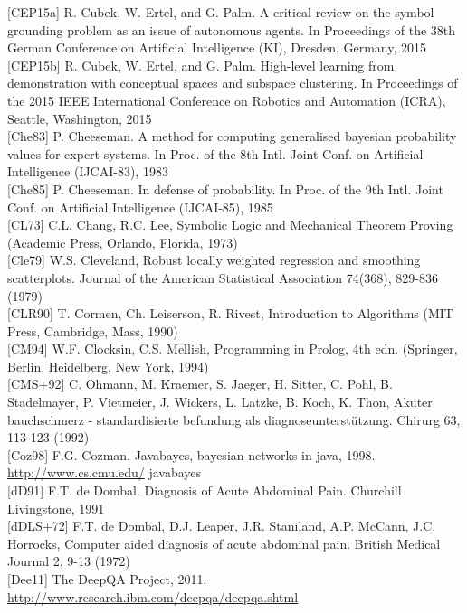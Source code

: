 \documentclass[10pt]{article}
\begin{document}
[CEP15a] R. Cubek, W. Ertel, and G. Palm. A critical review on the symbol grounding problem as an issue of autonomous agents. In Proceedings of the 38th German Conference on Artificial Intelligence (KI), Dresden, Germany, 2015\\[0pt]
[CEP15b] R. Cubek, W. Ertel, and G. Palm. High-level learning from demonstration with conceptual spaces and subspace clustering. In Proceedings of the 2015 IEEE International Conference on Robotics and Automation (ICRA), Seattle, Washington, 2015\\[0pt]
[Che83] P. Cheeseman. A method for computing generalised bayesian probability values for expert systems. In Proc. of the 8th Intl. Joint Conf. on Artificial Intelligence (IJCAI-83), 1983\\[0pt]
[Che85] P. Cheeseman. In defense of probability. In Proc. of the 9th Intl. Joint Conf. on Artificial Intelligence (IJCAI-85), 1985\\[0pt]
[CL73] C.L. Chang, R.C. Lee, Symbolic Logic and Mechanical Theorem Proving (Academic Press, Orlando, Florida, 1973)\\[0pt]
[Cle79] W.S. Cleveland, Robust locally weighted regression and smoothing scatterplots. Journal of the American Statistical Association 74(368), 829-836 (1979)\\[0pt]
[CLR90] T. Cormen, Ch. Leiserson, R. Rivest, Introduction to Algorithms (MIT Press, Cambridge, Mass, 1990)\\[0pt]
[CM94] W.F. Clocksin, C.S. Mellish, Programming in Prolog, 4th edn. (Springer, Berlin, Heidelberg, New York, 1994)\\[0pt]
[CMS+92] C. Ohmann, M. Kraemer, S. Jaeger, H. Sitter, C. Pohl, B. Stadelmayer, P. Vietmeier, J. Wickers, L. Latzke, B. Koch, K. Thon, Akuter bauchschmerz - standardisierte befundung als diagnoseunterstützung. Chirurg 63, 113-123 (1992)\\[0pt]
[Coz98] F.G. Cozman. Javabayes, bayesian networks in java, 1998. \href{http://www.cs.cmu.edu/}{http://www.cs.cmu.edu/} javabayes\\[0pt]
[dD91] F.T. de Dombal. Diagnosis of Acute Abdominal Pain. Churchill Livingstone, 1991\\[0pt]
[dDLS+72] F.T. de Dombal, D.J. Leaper, J.R. Staniland, A.P. McCann, J.C. Horrocks, Computer aided diagnosis of acute abdominal pain. British Medical Journal 2, 9-13 (1972)\\[0pt]
[Dee11] The DeepQA Project, 2011. \href{http://www.research.ibm.com/deepqa/deepqa.shtml}{http://www.research.ibm.com/deepqa/deepqa.shtml}\\[0pt]
\end{document}

